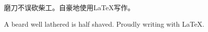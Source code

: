
\begin{cabstract}

磨刀不误砍柴工。自豪地使用\LaTeX{}写作。

\end{cabstract}



\begin{eabstract}

A beard well lathered is half shaved. Proudly writing with \LaTeX{}.

\end{eabstract}

